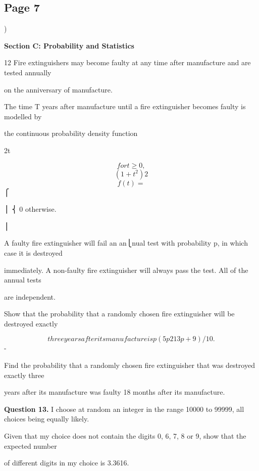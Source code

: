 \documentclass[12pt]{article}
\begin{document}
\subsection*{Page 7}
\begin{flushleft}
)\par
\bigskip\textbf{Section C: Probability and Statistics}\par
12 Fire extinguishers may become faulty at any time after manufacture and are tested annually\par
on the anniversary of manufacture.\par
The time T years after manufacture until a fire extinguisher becomes faulty is modelled by\par
the continuous probability density function\par
2t\par
\[for t \geq 0 ,\]
\[(1 + t^2)2\]
\[f(t) =\]
⎧\par
⎪ ⎨ 0 otherwise.\par
⎪\par
A faulty fire extinguisher will fail an an⎩nual test with probability p, in which case it is destroyed\par
immediately. A non-faulty fire extinguisher will always pass the test. All of the annual tests\par
are independent.\par
Show that the probability that a randomly chosen fire extinguisher will be destroyed exactly\par
\[three years after its manufacture is p(5p2 13p + 9)/10.\]
-\par
Find the probability that a randomly chosen fire extinguisher that was destroyed exactly three\par
years after its manufacture was faulty 18 months after its manufacture.\par
\bigskip\textbf{Question 13.} I choose at random an integer in the range 10000 to 99999, all choices being equally likely.\par
Given that my choice does not contain the digits 0, 6, 7, 8 or 9, show that the expected number\par
of different digits in my choice is 3.3616.\par
\end{flushleft}
\end{document}
